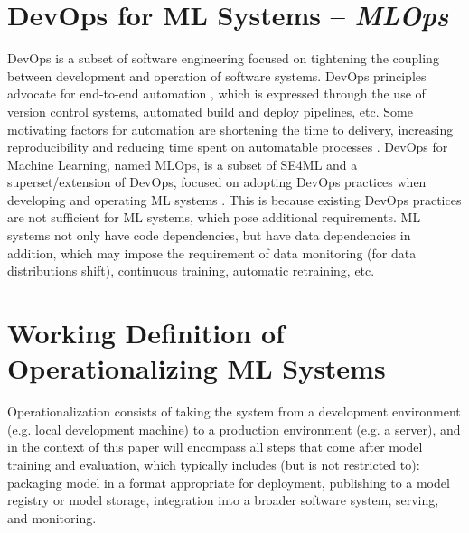\section{DevOps for ML Systems -- \emph{MLOps}}
DevOps is a subset of software engineering focused on tightening the coupling between development and operation of software systems.
DevOps principles advocate for end-to-end automation \cite{Ebert2016}, which is expressed through the use of version control systems, automated build and deploy pipelines, etc.
Some motivating factors for automation are shortening the time to delivery, increasing reproducibility and reducing time spent on automatable processes \cite{Franca2016}.
DevOps for Machine Learning, named MLOps, is a subset of SE4ML and a superset/extension of DevOps, focused on adopting DevOps practices when developing and operating ML systems \cite{Soh2020}.
This is because existing DevOps practices are not sufficient for ML systems, which pose additional requirements.
ML systems not only have code dependencies, but have data dependencies in addition, which may impose the requirement of data monitoring (for data distributions shift), continuous training, automatic retraining, etc.

\section{Working Definition of Operationalizing ML Systems}
\label{sec:deploying_ml_systems}
Operationalization consists of taking the system from a development environment (e.g. local development machine) to a production environment (e.g. a server), and in the context of this paper will encompass all steps that come after model training and evaluation, which typically includes (but is not restricted to): packaging model in a format appropriate for deployment, publishing to a model registry or model storage, integration into a broader software system, serving, and monitoring.
